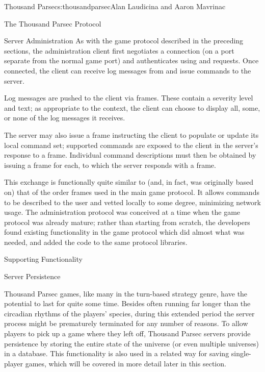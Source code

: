 \begin{aosachapter}{Thousand Parsec}{s:thousandparsec}{Alan Laudicina and Aaron Mavrinac}
\begin{aosasect1}{The Thousand Parsec Protocol}
\begin{aosasect2}{Server Administration}
As with the game protocol described in the preceding sections, the
administration client first negotiates a connection (on a port
separate from the normal game port) and authenticates using
 and  requests. Once connected, the client
can receive log messages from and issue commands to the server.

Log messages are pushed to the client via 
frames. These contain a severity level and text; as appropriate to the
context, the client can choose to display all, some, or none of the
log messages it receives.

The server may also issue a  frame instructing
the client to populate or update its local command set; supported
commands are exposed to the client in the server's response to a
 frame. Individual command
descriptions must then be obtained by issuing a  frame for each, to which the server responds with a
 frame.

This exchange is functionally quite similar to (and, in fact, was
originally based on) that of the order frames used in the main game
protocol. It allows commands to be described to the user and vetted
locally to some degree, minimizing network usage. The administration
protocol was conceived at a time when the game protocol was already
mature; rather than starting from scratch, the developers found
existing functionality in the game protocol which did almost what was
needed, and added the code to the same protocol libraries.

\end{aosasect2}

\end{aosasect1}

\begin{aosasect1}{Supporting Functionality}

\begin{aosasect2}{Server Persistence}

Thousand Parsec games, like many in the turn-based strategy genre,
have the potential to last for quite some time. Besides often running
far longer than the circadian rhythms of the players' species, during
this extended period the server process might be prematurely
terminated for any number of reasons. To allow players to pick up a
game where they left off, Thousand Parsec servers provide persistence
by storing the entire state of the universe (or even multiple
universes) in a database. This functionality is also used in a related
way for saving single-player games, which will be covered in more
detail later in this section.


\end{aosasect2}
\end{aosasect1}
\end{aosachapter}
